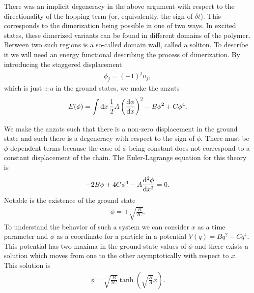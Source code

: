 There was an implicit degeneracy in the above argument with respect to the directionality of the hopping term (or, equivalently, the sign of $\delta t$). This corresponds to the dimerization being possible in one of two ways. In excited states, these dimerized variants can be found in different domains of the polymer. Between two such regions is a so-called domain wall, called a soliton. To describe it we will need an energy functional describing the process of dimerization. By introducing the staggered displacement
\begin{align*}
	\phi_{j} = (-1)^{j}u_{j},
\end{align*}
which is just $\pm u$ in the ground states, we make the anzats
\begin{align*}
	E(\phi) = \int\limits_{}^{}\dd{x}\frac{1}{2}A\left(\dv{\phi}{x}\right)^{2} - B\phi^{2} + C\phi^{4}.
\end{align*}
We make the anzats such that there is a non-zero displacement in the ground state and such there is a degeneracy with respect to the sign of $\phi$. There must be $\phi$-dependent terms because the case of $\phi$ being constant does not correspond to a constant displacement of the chain. The Euler-Lagrange equation for this theory is
\begin{align*}
	-2B\phi + 4C\phi^{3} - A\dv[2]{\phi}{x} = 0.
\end{align*}
Notable is the existence of the ground state
\begin{align*}
	\phi = \pm\sqrt{\frac{B}{2C}}.
\end{align*}
To understand the behavior of such a system we can consider $x$ as a time parameter and $\phi$ as a coordinate for a particle in a potential $V(q) = Bq^{2} - Cq^{4}$. This potential has two maxima in the ground-state values of $\phi$ and there exists a solution which moves from one to the other asymptotically with respect to $x$. This solution is
\begin{align*}
	\phi = \sqrt{\frac{B}{2C}}\tanh(\sqrt{\frac{B}{A}}x).
\end{align*}

